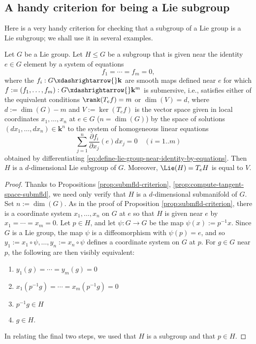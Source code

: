 \documentclass[reqno]{amsart} 
\begin{document}
\subsection{A handy criterion for being a Lie subgroup}
\label{sec:orgd63ace1}
Here is a very handy criterion for checking that
a subgroup of a Lie group is a Lie subgroup;
we shall use it in several examples.
\begin{lemma}\label{lem:lie-subgroups-criterion}
  Let $G$ be a Lie group.
  Let $H \leq G$ be a subgroup
  that is given near the identity $e \in G$
  element by a system of equations
  \begin{equation}\label{eq:define-lie-group-near-identity-by-equations}
      f_1 = \dotsb = f_m = 0,
  \end{equation}
  where the $f_i : G \xdashrightarrow{} \mathbf{k}$ are smooth
  maps defined near $e$
  for which
  $f := (f_1,\dotsc,f_m) : G \xdashrightarrow{} \mathbf{k}^m$ is
  submersive,
  i.e.,
  satisfies
  either of the equivalent conditions
  $\rank(T_e f) = m$
  or
  $\dim (V) = d$,
  where $d := \dim(G) - m$ and
  $V := \ker(T_e f)$ is the vector space
  given in local coordinates $x_1,\dotsc,x_n$ at $e \in G$ ($n =
  \dim(G)$)
  by the
  space of solutions $(d x_1,\dotsc, d x _n) \in \mathbf{k}^n$
  to the
  system of homogeneous linear equations
  \begin{equation*}
    \sum_{j=1}^n \frac{\partial f_i}{\partial x_j}(e) d x _j = 0
    \quad (i=1..m)
    \end{equation*}
  obtained by differentiating \eqref{eq:define-lie-group-near-identity-by-equations}.
  Then $H$ is a $d$-dimensional Lie subgroup of $G$.
  Moreover, $\Lie(H) = T_e H$ is equal to $V$.
\end{lemma}
\begin{proof}
  Thanks to Propositions \ref{prop:submfld-criterion}, \ref{prop:compute-tangent-space-submfld},
  we need only verify that $H$ is a $d$-dimensional
  submanifold of $G$.  
  Set
  $n := \dim(G)$.
  As in the proof of Proposition \ref{prop:submfld-criterion}, there is a coordinate
  system $x_1,\dotsc,x_n$ on $G$ at $e$ so that $H$ is
  given near $e$ by
  $x_{1}= \dotsb = x_m = 0$.
  Let
  $p \in H$, and let $\psi : G \rightarrow G$ be the map
  $\psi(x) := p^{-1} x$.  Since $G$ is a Lie group, the map
  $\psi$ is a diffeomorphism with $\psi(p) = e$,
  and so
  $y_1 := x_1 \circ \psi, \dotsc, y_n := x_n \circ \psi$ defines
  a coordinate system on $G$ at $p$.  For $g \in G$ near $p$,
  the following are then visibly equivalent:
\begin{enumerate}
\item $y_1(g) = \dotsb = y_m(g) = 0$
\item $x_1(p^{-1} g) = \dotsb = x_m(p^{-1} g) = 0$
\item $p^{-1} g \in H$
\item $g \in H$.
\end{enumerate}
In relating the final two steps, we used that $H$ is a subgroup
and that $p \in H$.
\end{proof}
\end{document}
